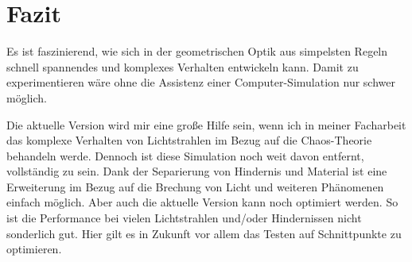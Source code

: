 \chapter{Fazit}
Es ist faszinierend, wie sich in der geometrischen Optik aus simpelsten Regeln schnell spannendes und komplexes Verhalten entwickeln kann.
Damit zu experimentieren wäre ohne die Assistenz einer Computer-Simulation nur schwer möglich. 

Die aktuelle Version wird mir eine große Hilfe sein, wenn ich in meiner Facharbeit 
das komplexe Verhalten von Lichtstrahlen im Bezug auf die Chaos-Theorie behandeln werde.
Dennoch ist diese Simulation noch weit davon entfernt, vollständig zu sein. 
Dank der Separierung von Hindernis und Material ist eine Erweiterung im Bezug auf die Brechung von Licht und weiteren Phänomenen einfach möglich.
Aber auch die aktuelle Version kann noch optimiert werden. So ist die Performance bei vielen Lichtstrahlen und/oder Hindernissen nicht sonderlich gut.
Hier gilt es in Zukunft vor allem das Testen auf Schnittpunkte zu optimieren. 